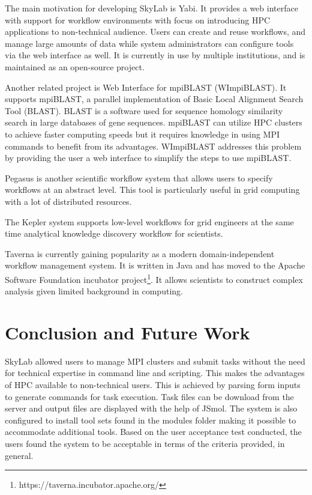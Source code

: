 The main motivation for developing SkyLab is Yabi\cite{7411021620120101}. It provides a web interface with support for workflow environments with focus on introducing HPC applications to non-technical audience. Users can create and reuse workflows, and manage large amounts of data while system administrators can configure tools via the web interface as well. It is currently in use by multiple institutions, and is maintained as an open-source project.	    	    
	    
Another related project is Web Interface for mpiBLAST (WImpiBLAST). It supports mpiBLAST, a parallel implementation of Basic Local Alignment Search Tool (BLAST). BLAST is a software used for sequence homology similarity search in large databases of gene sequences. mpiBLAST can utilize HPC clusters to achieve faster computing speeds but it requires knowledge in using MPI commands to benefit from its advantages. WImpiBLAST addresses this problem by providing the user a web interface to simplify the steps to use mpiBLAST\cite{9686120720140601}.   
	
Pegasus \cite{deelman2005pegasus} is another scientific workflow system that allows users to specify workflows at an abstract level. This tool is particularly useful in grid computing with a lot of distributed resources.

The Kepler \cite{ludascher2006scientific} system supports low-level workflows for grid engineers at the same time analytical knowledge discovery workflow for scientists.	

Taverna \cite{hull2006taverna} is currently gaining popularity as a modern domain-independent workflow management system. It is written in Java and has moved to the Apache Software Foundation incubator project\footnote{https://taverna.incubator.apache.org/}. It allows scientists to construct complex analysis given limited background in computing.  
	
\section{Conclusion and Future Work}
SkyLab allowed users to manage MPI clusters and submit tasks without the need for technical expertise in command line and scripting. This makes the advantages of HPC available to non-technical users. This is achieved by parsing form inputs to generate commands for task execution. Task files can be download from the server and output files are displayed with the help of JSmol. The system is also configured to install tool sets found in the modules folder making it possible to accommodate additional tools. Based on the user acceptance test conducted, the users found the system to be acceptable in terms of the criteria provided, in general. 

